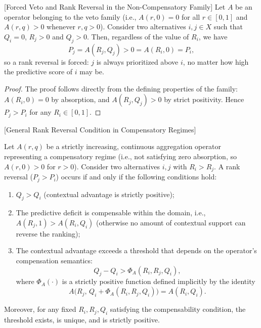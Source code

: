 \documentclass[mathematics,article,submit,moreauthors]{Definitions/mdpi}
\begin{document}
\begin{Theorem}{\color{red}[Forced Veto and Rank Reversal in the Non-Compensatory Family]}
\label{thm:veto}
{\color{red}
Let $A$ be an operator belonging to the veto family (i.e., $A(r,0)=0$ for all $r\in[0,1]$ and $A(r,q)>0$ whenever $r,q>0$). Consider two alternatives $i,j\in X$ such that $Q_i=0$, $R_j>0$ and $Q_j>0$. Then, regardless of the value of $R_i$, we have
\[
P_j = A(R_j,Q_j) > 0 = A(R_i,0) = P_i,
\]
so a rank reversal is forced: $j$ is always prioritized above $i$, no matter how high the predictive score of $i$ may be.
}
\end{Theorem}

{\color{red}
\begin{proof}
The proof follows directly from the defining properties of the family: $A(R_i,0)=0$ by absorption, and $A(R_j,Q_j)>0$ by strict positivity. Hence $P_j>P_i$ for any $R_i\in[0,1]$.
\end{proof}
}

\begin{Theorem}{\color{red}[General Rank Reversal Condition in Compensatory Regimes]}
    \label{thm:compensatory_reversal}
    {\color{red}
    Let $A(r,q)$ be a strictly increasing, continuous aggregation operator representing a compensatory regime (i.e., not satisfying zero absorption, so $A(r,0)>0$ for $r>0$). Consider two alternatives $i,j$ with $R_i > R_j$. A rank reversal ($P_j > P_i$) occurs if and only if the following conditions hold:
    
    \begin{enumerate}
    \item $Q_j > Q_i$ (contextual advantage is strictly positive);
    \item The predictive deficit is compensable within the domain, i.e., $A(R_j,1) > A(R_i,Q_i)$ (otherwise no amount of contextual support can reverse the ranking);
    \item The contextual advantage exceeds a threshold that depends on the operator's compensation semantics:
    \[
    Q_j - Q_i > \Phi_A(R_i, R_j, Q_i),
    \]
    where $\Phi_A(\cdot)$ is a strictly positive function defined implicitly by the identity
    \[
    A\bigl(R_j,\, Q_i + \Phi_A(R_i, R_j, Q_i)\bigr) = A(R_i, Q_i).
    \]
    \end{enumerate}
    
    Moreover, for any fixed $R_i,R_j,Q_i$ satisfying the compensability condition, the threshold exists, is unique, and is strictly positive.
    }
\end{Theorem}
\end{document}
